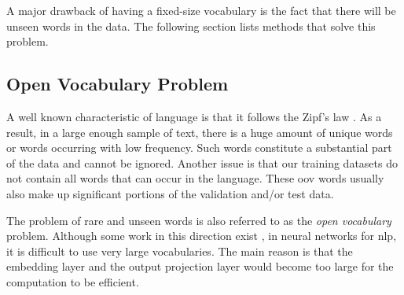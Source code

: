 A major drawback of having a fixed-size vocabulary is the fact that there will
be unseen words in the data. The following section lists methods that solve
this problem.




\subsection{Open Vocabulary Problem}

A well known characteristic of language is that it follows the Zipf's law
\citep{zipf1949human}. As a result, in a large enough sample of text, there is
a huge amount of unique words or words occurring with low frequency. Such words
constitute a substantial part of the data and cannot be ignored.  Another issue
is that our training datasets do not contain all words that can occur in the
language. These \gls{oov} words usually also make up significant portions of
the validation and/or test data.

The problem of rare and unseen words is also referred to as the \emph{open
vocabulary} problem. Although some work in this direction exist
\citep{jean2015using}, in neural networks for \gls{nlp}, it is difficult to use
very large vocabularies. The main reason is that the embedding layer and the
output projection layer would become too large for the computation to be
efficient.

